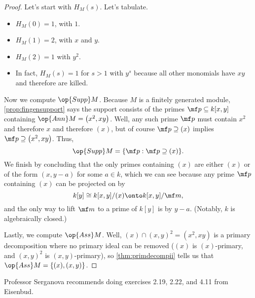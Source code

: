 \documentclass[../notes.tex]{subfiles}
\begin{document}
\begin{proof}
	Let's start with $H_M(s)$. Let's tabulate.
	\begin{itemize}
		\item $H_M(0)=1$, with $1$.
		\item $H_M(1)=2$, with $x$ and $y$.
		\item $H_M(2)=1$ with $y^2$.
		\item In fact, $H_M(s)=1$ for $s>1$ with $y^s$ because all other monomials have $xy$ and therefore are killed.
	\end{itemize}

	Now we compute $\op{Supp}M$. Because $M$ is a finitely generated module, \autoref{prop:fingensupport} says the support consists of the primes $\mf p\subseteq k[x,y]$ containing $\op{Ann}M=\left(x^2,xy\right)$. Well, any such prime $\mf p$ must contain $x^2$ and therefore $x$ and therefore $(x)$, but of course $\mf p\supseteq(x)$ implies $\mf p\supseteq\left(x^2,xy\right)$. Thus,
	\[\op{Supp}M=\{\mf p:\mf p\supseteq(x)\}.\]
	We finish by concluding that the only primes containing $(x)$ are either $(x)$ or of the form $(x,y-a)$ for some $a\in k$, which we can see because any prime $\mf p$ containing $(x)$ can be projected on by
	\[k[y]\cong k[x,y]/(x)\onto k[x,y]/\mf m,\]
	and the only way to lift $\mf m$ to a prime of $k[y]$ is by $y-a$. (Notably, $k$ is algebraically closed.)

	Lastly, we compute $\op{Ass}M$. Well, $(x)\cap(x,y)^2=\left(x^2,xy\right)$ is a primary decomposition where no primary ideal can be removed ($(x)$ is $(x)$-primary, and $(x,y)^2$ is $(x,y)$-primary), so \autoref{thm:primdecompii} tells us that $\op{Ass}M=\{(x),(x,y)\}$.
\end{proof}
\begin{remark}
	Professor Serganova recommends doing exercises 2.19, 2.22, and 4.11 from Eisenbud.
\end{remark}
\end{document}
